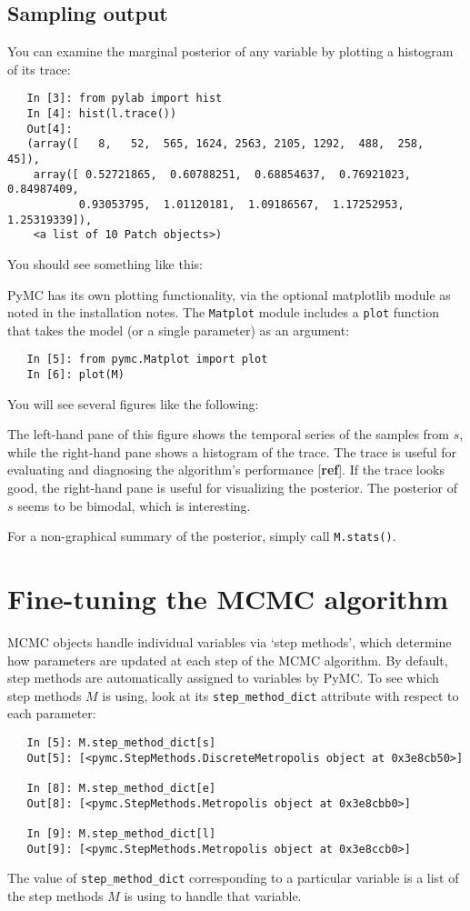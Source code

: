 \subsection*{Sampling output} 
You can examine the marginal posterior of any variable by plotting a histogram of its trace:
\begin{verbatim}
   In [3]: from pylab import hist
   In [4]: hist(l.trace())
   Out[4]: 
   (array([   8,   52,  565, 1624, 2563, 2105, 1292,  488,  258,   45]),
    array([ 0.52721865,  0.60788251,  0.68854637,  0.76921023,  0.84987409,
           0.93053795,  1.01120181,  1.09186567,  1.17252953,  1.25319339]),
    <a list of 10 Patch objects>)
\end{verbatim}
You should see something like this:
\begin{center}
\end{center}
PyMC has its own plotting functionality, via the optional matplotlib module as noted in the installation notes. The \texttt{Matplot} module includes a \texttt{plot} function that takes the model (or a single parameter) as an argument:
\begin{verbatim}
   In [5]: from pymc.Matplot import plot
   In [6]: plot(M)
\end{verbatim}
You will see several figures like the following:
\begin{center}
\end{center}
The left-hand pane of this figure shows the temporal series of the samples from $s$, while the right-hand pane shows a histogram of the trace. The trace is useful for evaluating and diagnosing the algorithm's performance [\textbf{ref}]. If the trace looks good, the right-hand pane is useful for visualizing the posterior. The posterior of $s$ seems to be bimodal, which is interesting.

For a non-graphical summary of the posterior, simply call \texttt{M.stats()}.


\section*{Fine-tuning the MCMC algorithm} 

MCMC objects handle individual variables via `step methods', which determine how parameters are updated at each step of the MCMC algorithm. By default, step methods are automatically assigned to variables by PyMC. To see which step methods $M$ is using, look at its \texttt{step_method_dict} attribute with respect to each parameter:
\begin{verbatim}
   In [5]: M.step_method_dict[s]
   Out[5]: [<pymc.StepMethods.DiscreteMetropolis object at 0x3e8cb50>]
   
   In [8]: M.step_method_dict[e]
   Out[8]: [<pymc.StepMethods.Metropolis object at 0x3e8cbb0>]

   In [9]: M.step_method_dict[l]
   Out[9]: [<pymc.StepMethods.Metropolis object at 0x3e8ccb0>]
\end{verbatim}
The value of \texttt{step_method_dict} corresponding to a particular variable is a list of the step methods $M$ is using to handle that variable. 

